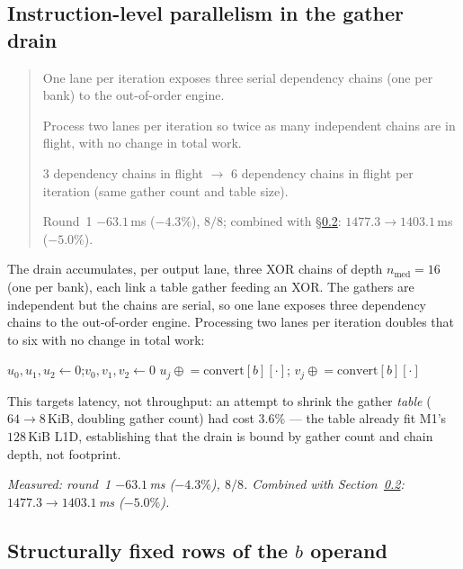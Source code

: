 \documentclass[11pt]{article}
\newenvironment{optsummary}{%
  \begin{quote}\small
  \begin{description}
  \setlength{\itemsep}{1pt}\setlength{\parsep}{0pt}\setlength{\topsep}{2pt}
}{%
  \end{description}
  \end{quote}
}
\begin{document}
\subsection{Instruction-level parallelism in the gather drain}\label{sec:twolane}

\begin{optsummary}
\item[Baseline:] One lane per iteration exposes three serial dependency chains (one per bank) to the out-of-order engine.
\item[Improvement:] Process two lanes per iteration so twice as many independent chains are in flight, with no change in total work.
\item[Mechanism:] 3 dependency chains in flight $\to$ 6 dependency chains in flight per iteration (same gather count and table size).
\item[Result:] Round~1 $-63.1\,$ms ($-4.3\%$), $8/8$; combined with \S\ref{sec:zeroskip}: $1477.3\to1403.1\,$ms ($-5.0\%$).
\end{optsummary}

The drain accumulates, per output lane, three XOR chains of depth
$n_{\mathrm{med}}=16$ (one per bank), each link a table gather feeding an XOR.
The gathers are independent but the chains are serial, so one lane exposes
three dependency chains to the out-of-order engine. Processing two lanes per
iteration doubles that to six with no change in total work:

\begin{algorithmic}[1]
  \State $u_0,u_1,u_2 \gets 0$;\quad $v_0,v_1,v_2 \gets 0$
    \State $u_j \mathrel{\oplus}= \mathrm{convert}[b][\cdot]$;\quad
           $v_j \mathrel{\oplus}= \mathrm{convert}[b][\cdot]$
  \EndFor
\EndFor
\end{algorithmic}

This targets latency, not throughput: an attempt to shrink the gather
\emph{table} ($64\to8\,$KiB, doubling gather count) had cost $3.6\%$ --- the
table already fit M1's $128\,$KiB L1D, establishing that the drain is bound by
gather count and chain depth, not footprint.

\emph{Measured: round~1 $-63.1\,$ms ($-4.3\%$), $8/8$. Combined with
Section~\ref{sec:zeroskip}: $1477.3\to1403.1\,$ms ($-5.0\%$).}

\subsection{Structurally fixed rows of the $b$ operand}\label{sec:zeroskip}
\end{document}
